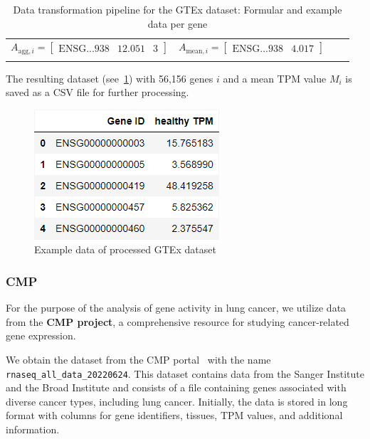 \begin{table}[h]
{\begin{tabular}{|c|c|c|c|}
        $ A_{\text{agg}, i} = \begin{bmatrix}
            \text{ENSG...938} & 12.051 & 3
        \end{bmatrix}$ &

        $ A_{\text{mean}, i} = \begin{bmatrix}
            \text{ENSG...938} & 4.017
        \end{bmatrix}$ \\

        & & & \\[1mm] %
        \hline
    \end{tabular}
    }
    \caption{Data transformation pipeline for the GTEx dataset: Formular and example data per gene}\label{tab:gtex_table}
\end{table}

The resulting dataset (see~\cref{fig:03_01_df_GTEX_healthy_mean}) with 56,156 genes $i$
and a mean TPM value $M_i$ is saved as a CSV file for further processing.\\

\begin{figure}[h]
    \centering
    \includegraphics[height=\dfheight]{figures/03_01_GTEX_healthy_mean}
    \caption{Example data of processed GTEx dataset}
    \label{fig:03_01_df_GTEX_healthy_mean}
\end{figure}



\subsubsection*{CMP} \label{subsubsec:CMP}
For the purpose of the analysis of gene activity in lung cancer, we utilize data from the \textbf{CMP project},
a comprehensive resource for studying cancer-related gene expression.

We obtain the dataset from the CMP portal~\cite{cmp_download} with the name \texttt{rnaseq\_all\_data\_20220624}.
This dataset contains data from the Sanger Institute and the Broad Institute and
consists of a file containing genes associated with diverse cancer types, including lung cancer.
Initially, the data is stored in long format with columns for gene identifiers, tissues, TPM values,
and additional information.


